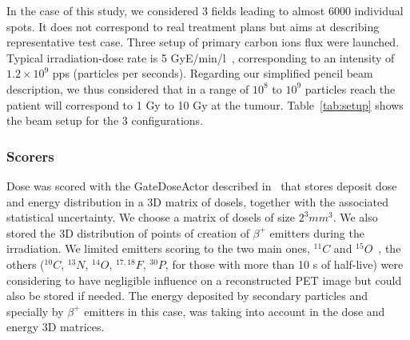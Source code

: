 \documentclass[11pt]{iopart}
\begin{document}
In the case of this study, we considered 3 fields leading to almost
6000 individual spots. It does not correspond to real treatment plans
but aims at describing representative test case. Three setup of
primary carbon ions flux were launched. Typical irradiation-dose rate
is 5 GyE/min/l~\cite{Noda2007}, corresponding to an intensity of
$1.2\times 10^9$ pps (particles per seconds). Regarding our simplified
pencil beam description, we thus considered that in a range of $10^8$
to $10^9$ particles reach the patient will correspond to 1 Gy to 10 Gy
at the tumour. Table~\ref{tab:setup} shows the beam setup for the 3
configurations.





\subsubsection{Scorers}

Dose was scored with the GateDoseActor described
in~\cite{Jan2011,Sarrut2008} that stores deposit dose and energy
distribution in a 3D matrix of dosels, together with the associated
statistical uncertainty. We choose a matrix of dosels of size $2^3
mm^3$.  We also stored the 3D distribution of points of creation of
$\beta^+$ emitters during the irradiation. We limited emitters scoring
to the two main ones, $^{11}C$ and $^{15}O$~\cite{Pshenichnov2007},
the others ($^{10}C$, $^{13}N$, $^{14}O$, $^{17,18}F$, $^{30}P$, for
those with more than 10 s of half-live) were considering to have
negligible influence on a reconstructed PET image but could also be
stored if needed. The energy deposited by secondary particles and
specially by $\beta^+$ emitters in this case, was taking into account
in the dose and energy 3D matrices.
\end{document}
